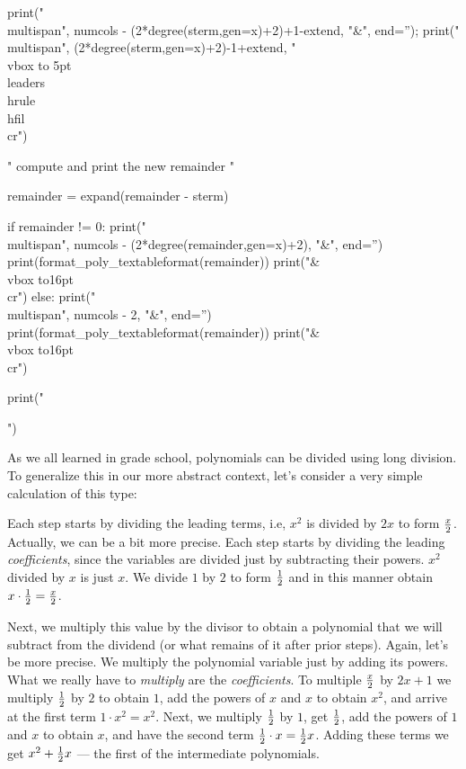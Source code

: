 \begin{sympycode}
{{      print("\\multispan{", numcols - (2*degree(sterm,gen=x)+2)+1-extend, "}&", end='');
      print("\\multispan{", (2*degree(sterm,gen=x)+2)-1+extend, "}\\vbox to 5pt{}\\leaders\\hrule\\hfil\\cr")

      " compute and print the new remainder "

      remainder = expand(remainder - sterm)

      if remainder != 0:
         print("\\multispan{", numcols - (2*degree(remainder,gen=x)+2), "}&", end='')
         print(format_poly_textableformat(remainder))
         print("&\\vbox to16pt{}\\cr")
      else:
         print("\\multispan{", numcols - 2, "}&", end='')
         print(format_poly_textableformat(remainder))
         print("&\\vbox to16pt{}\\cr")

   print("}}")
\end{sympycode}

As we all learned in grade school, polynomials can be divided
using long division.  To generalize this in our more abstract
context, let's consider a very simple calculation of this type:




Each step starts by dividing the leading terms, i.e, $x^2$ is divided
by $2x$ to form $x\over 2$.  Actually, we can be a bit more precise.
Each step starts by dividing the leading {\it coefficients},
since the variables are divided just by subtracting their
powers. $x^2$ divided by $x$ is just $x$.  We divide $1$ by $2$
to form $1\over2$ and in this manner obtain $x\cdot{1\over2}={x\over2}$.

Next, we multiply this value by the divisor to obtain a polynomial
that we will subtract from the dividend (or what remains of it after
prior steps).  Again, let's be more precise.  We multiply the
polynomial variable just by adding its powers.  What we really have to
{\it multiply} are the {\it coefficients}.  To multiple $x\over2$ by
$2x+1$ we multiply $1\over2$ by $2$ to obtain $1$, add the powers of
$x$ and $x$ to obtain $x^2$, and arrive at the first term $1\cdot
x^2=x^2$.  Next, we multiply $1\over2$ by $1$, get $1\over2$, add the
powers of $1$ and $x$ to obtain $x$, and have the second term
${1\over2}\cdot x={1\over2}x$.  Adding these terms we get
$x^2+{1\over2}x$ --- the first of the intermediate polynomials.

